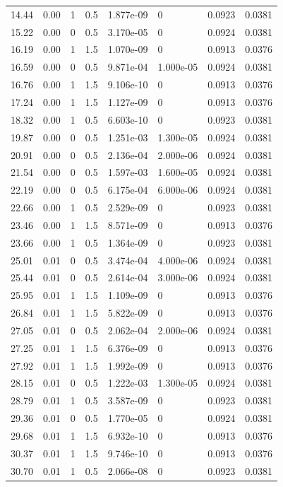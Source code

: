 \documentclass[preview]{standalone}
\begin{document}
{{\begin{tabular}{L{1.2cm}C{1.2cm} C{0.3cm}C{0.5cm} C{1.4cm}C{1.4cm} C{1.4cm}C{1.4cm}}
  14.44  &  0.00  & 1     & 0.5 &  1.877e-09  & 0  & 0.0923 &  0.0381   \\ 
  15.22  &  0.00  & 0     & 0.5 &  3.170e-05  & 0  & 0.0924 &  0.0381   \\ 
  16.19  &  0.00  & 1     & 1.5 &  1.070e-09  & 0  & 0.0913 &  0.0376   \\ 
  16.59  &  0.00  & 0     & 0.5 &  9.871e-04  & 1.000e-05  & 0.0924 &  0.0381   \\ 
  16.76  &  0.00  & 1     & 1.5 &  9.106e-10  & 0  & 0.0913 &  0.0376   \\ 
  17.24  &  0.00  & 1     & 1.5 &  1.127e-09  & 0  & 0.0913 &  0.0376   \\ 
  18.32  &  0.00  & 1     & 0.5 &  6.603e-10  & 0  & 0.0923 &  0.0381   \\ 
  19.87  &  0.00  & 0     & 0.5 &  1.251e-03  & 1.300e-05  & 0.0924 &  0.0381   \\ 
  20.91  &  0.00  & 0     & 0.5 &  2.136e-04  & 2.000e-06  & 0.0924 &  0.0381   \\ 
  21.54  &  0.00  & 0     & 0.5 &  1.597e-03  & 1.600e-05  & 0.0924 &  0.0381   \\ 
  22.19  &  0.00  & 0     & 0.5 &  6.175e-04  & 6.000e-06  & 0.0924 &  0.0381   \\ 
  22.66  &  0.00  & 1     & 0.5 &  2.529e-09  & 0  & 0.0923 &  0.0381   \\ 
  23.46  &  0.00  & 1     & 1.5 &  8.571e-09  & 0  & 0.0913 &  0.0376   \\ 
  23.66  &  0.00  & 1     & 0.5 &  1.364e-09  & 0  & 0.0923 &  0.0381   \\ 
  25.01  &  0.01  & 0     & 0.5 &  3.474e-04  & 4.000e-06  & 0.0924 &  0.0381   \\ 
  25.44  &  0.01  & 0     & 0.5 &  2.614e-04  & 3.000e-06  & 0.0924 &  0.0381   \\ 
  25.95  &  0.01  & 1     & 1.5 &  1.109e-09  & 0  & 0.0913 &  0.0376   \\ 
  26.84  &  0.01  & 1     & 1.5 &  5.822e-09  & 0  & 0.0913 &  0.0376   \\ 
  27.05  &  0.01  & 0     & 0.5 &  2.062e-04  & 2.000e-06  & 0.0924 &  0.0381   \\ 
  27.25  &  0.01  & 1     & 1.5 &  6.376e-09  & 0  & 0.0913 &  0.0376   \\ 
  27.92  &  0.01  & 1     & 1.5 &  1.992e-09  & 0  & 0.0913 &  0.0376   \\ 
  28.15  &  0.01  & 0     & 0.5 &  1.222e-03  & 1.300e-05  & 0.0924 &  0.0381   \\ 
  28.79  &  0.01  & 1     & 0.5 &  3.587e-09  & 0  & 0.0923 &  0.0381   \\ 
  29.36  &  0.01  & 0     & 0.5 &  1.770e-05  & 0  & 0.0924 &  0.0381   \\ 
  29.68  &  0.01  & 1     & 1.5 &  6.932e-10  & 0  & 0.0913 &  0.0376   \\ 
  30.37  &  0.01  & 1     & 1.5 &  9.746e-10  & 0  & 0.0913 &  0.0376   \\ 
  30.70  &  0.01  & 1     & 0.5 &  2.066e-08  & 0  & 0.0923 &  0.0381   \\ 
\hline 
\end{tabular} 

}}
\end{document}

